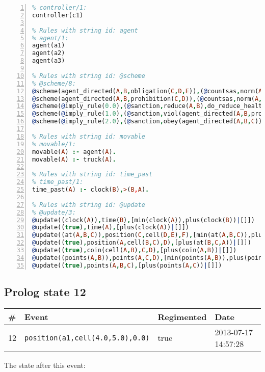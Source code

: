 \documentclass[11pt]{article}\usepackage[utf8]{inputenc}\usepackage{geometry}
\begin{document}
\begin{lstlisting}[language=Prolog, numbers=left]
% Rules with string id: controller
% controller/1:
controller(c1)

% Rules with string id: agent
% agent/1:
agent(a1)
agent(a2)
agent(a3)

% Rules with string id: @scheme
% @scheme/8:
@scheme(agent_directed(A,B,obligation(C,D,E)),(@countsas,norm(A,B,F,obligation(C,D,E)),F),false,(listTrue(C)),(time_past(D)),false,[plus(viol(agent_directed(A,B,obligation(C,D,E))))|[]],[plus(obey(agent_directed(A,B,obligation(C,D,E))))|[]])
@scheme(agent_directed(A,B,prohibition(C,D)),(@countsas,norm(A,B,E,prohibition(C,D)),E),(listTrue(C)),false,(false),false,[plus(viol(agent_directed(A,B,prohibition(C,D))))|[]],[plus(obey(agent_directed(A,B,prohibition(C,D))))|[]])
@scheme(@imply_rule(0.0),(@sanction,reduce(A,B),do_reduce_health(A,B),notifyAgent(A,changed(status))),true,false,false,false,[min(reduce(A,B))|[]],[])
@scheme(@imply_rule(1.0),(@sanction,viol(agent_directed(A,B,prohibition(C,D))),do_sanction(D)),true,false,false,false,[min(viol(agent_directed(A,B,prohibition(C,D))))|[]],[])
@scheme(@imply_rule(2.0),(@sanction,obey(agent_directed(A,B,C))),true,false,false,false,[min(obey(agent_directed(A,B,C)))|[]],[])

% Rules with string id: movable
% movable/1:
movable(A) :- agent(A).
movable(A) :- truck(A).

% Rules with string id: time_past
% time_past/1:
time_past(A) :- clock(B),>(B,A).

% Rules with string id: @update
% @update/3:
@update((clock(A)),time(B),[min(clock(A)),plus(clock(B))|[]])
@update((true),time(A),[plus(clock(A))|[]])
@update((at(A,B,C)),position(C,cell(D,E),F),[min(at(A,B,C)),plus(at(D,E,C))|[]])
@update((true),position(A,cell(B,C),D),[plus(at(B,C,A))|[]])
@update((true),coin(cell(A,B),C,D),[plus(coin(A,B))|[]])
@update((points(A,B)),points(A,C,D),[min(points(A,B)),plus(points(A,D))|[]])
@update((true),points(A,B,C),[plus(points(A,C))|[]])

\end{lstlisting}
\clearpage 
\subsection{Prolog state 12}
\begin{table}[ht]
\centering 
\begin{tabular}{l l l l} 
\textbf{\#} & \textbf{Event} & \textbf{Regimented} & \textbf{Date} \\ [0.5ex] 
\hline
12&\texttt{position(a1,cell(4.0,5.0),0.0)}&true&2013-07-17 14:57:28\\ [1ex] \hline\end{tabular}
\end{table}
The state after this event:
\end{document}

